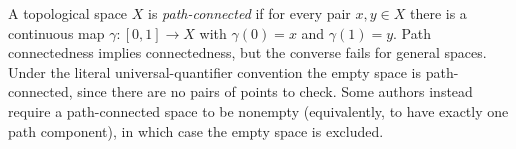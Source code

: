
A topological space $X$ is \emph{path-connected} if for every pair $x,y\in X$ there is a continuous map $\gamma:[0,1]\to X$ with $\gamma(0)=x$ and $\gamma(1)=y$. Path connectedness implies connectedness, but the converse fails for general spaces. Under the literal universal-quantifier convention the empty space is path-connected, since there are no pairs of points to check. Some authors instead require a path-connected space to be nonempty (equivalently, to have exactly one path component), in which case the empty space is excluded.
